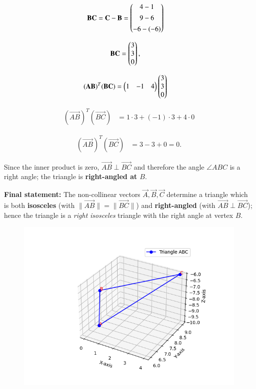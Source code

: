 \documentclass[journal]{IEEEtran}
\begin{document}
\begin{align}
\mathbf{BC} &= \mathbf{C}-\mathbf{B} = \begin{pmatrix}4-1\\[4pt]9-6\\[4pt]-6-(-6)\end{pmatrix}
\end{align}

\begin{align}
\mathbf{BC} &= \begin{pmatrix}3\\3\\0\end{pmatrix},
\end{align}

\begin{align}
(\mathbf{AB})^T(\mathbf{BC}) &= \begin{pmatrix}1&-1&4\end{pmatrix}\begin{pmatrix}3\\3\\0\end{pmatrix}
\end{align}

\begin{align}
(\vec{AB})^T(\vec{BC}) &= 1\cdot 3 + (-1)\cdot 3 + 4\cdot 0
\end{align}

\begin{align}
(\vec{AB})^T(\vec{BC}) &= 3 - 3 + 0 = 0.
\end{align}

Since the inner product is zero, $\vec{AB}\perp\vec{BC}$ and therefore the angle $\angle ABC$ is a right angle; the triangle is \textbf{right-angled at $B$}.



\noindent\textbf{Final statement:} The non-collinear vectors $\vec{A},\vec{B},\vec{C}$ determine a triangle which is both \textbf{isosceles} (with $\|\vec{AB}\|=\|\vec{BC}\|$) and \textbf{right-angled} (with $\vec{AB}\perp\vec{BC}$); hence the triangle is a \emph{right isosceles} triangle with the right angle at vertex $B$.

\begin{figure}[H]
    \centering
    \includegraphics[width=0.9\columnwidth]{figs/fig1.png}
    \caption{}
    \label{fig:}
\end{figure}
\end{document}
